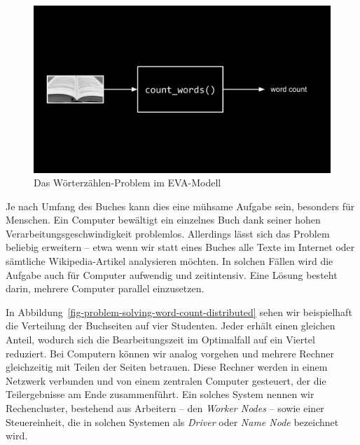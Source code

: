 \documentclass[
  ngerman,
  letterpaper,
  DIV=11]{scrreprt}
\begin{document}
\begin{figure}[H]

{\centering \includegraphics[width=1\linewidth,height=\textheight,keepaspectratio]{problem-solving_files/mediabag/problem_solving_exam1234567.png}

}

\caption{Das Wörterzählen-Problem im EVA-Modell}

\end{figure}%

Je nach Umfang des Buches kann dies eine mühsame Aufgabe sein, besonders
für Menschen. Ein Computer bewältigt ein einzelnes Buch dank seiner
hohen Verarbeitungsgeschwindigkeit problemlos. Allerdings lässt sich das
Problem beliebig erweitern -- etwa wenn wir statt eines Buches alle
Texte im Internet oder sämtliche Wikipedia-Artikel analysieren möchten.
In solchen Fällen wird die Aufgabe auch für Computer aufwendig und
zeitintensiv. Eine Lösung besteht darin, mehrere Computer parallel
einzusetzen.

In Abbildung~\ref{fig-problem-solving-word-count-distributed} sehen wir
beispielhaft die Verteilung der Buchseiten auf vier Studenten. Jeder
erhält einen gleichen Anteil, wodurch sich die Bearbeitungszeit im
Optimalfall auf ein Viertel reduziert. Bei Computern können wir analog
vorgehen und mehrere Rechner gleichzeitig mit Teilen der Seiten
betrauen. Diese Rechner werden in einem Netzwerk verbunden und von einem
zentralen Computer gesteuert, der die Teilergebnisse am Ende
zusammenführt. Ein solches System nennen wir Rechencluster, bestehend
aus Arbeitern -- den \emph{Worker Nodes} -- sowie einer Steuereinheit,
die in solchen Systemen als \emph{Driver} oder \emph{Name Node}
bezeichnet wird.
\end{document}
